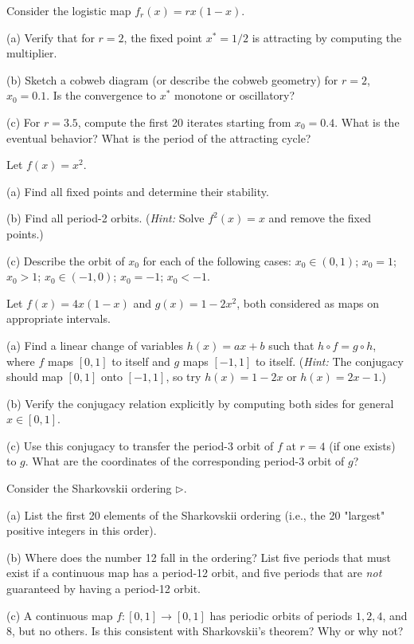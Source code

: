 \begin{exercise}
Consider the logistic map $f_r(x) = rx(1-x)$.

(a) Verify that for $r = 2$, the fixed point $x^* = 1/2$ is attracting by computing the multiplier.

(b) Sketch a cobweb diagram (or describe the cobweb geometry) for $r = 2$, $x_0 = 0.1$. Is the convergence to $x^*$ monotone or oscillatory?

(c) For $r = 3.5$, compute the first 20 iterates starting from $x_0 = 0.4$. What is the eventual behavior? What is the period of the attracting cycle?
\end{exercise}


\begin{exercise}
Let $f(x) = x^2$.

(a) Find all fixed points and determine their stability.

(b) Find all period-2 orbits. (\textit{Hint:} Solve $f^2(x) = x$ and remove the fixed points.)

(c) Describe the orbit of $x_0$ for each of the following cases: $x_0 \in (0,1)$; $x_0 = 1$; $x_0 > 1$; $x_0 \in (-1,0)$; $x_0 = -1$; $x_0 < -1$.
\end{exercise}


\begin{exercise}
Let $f(x) = 4x(1-x)$ and $g(x) = 1 - 2x^2$, both considered as maps on appropriate intervals.

(a) Find a linear change of variables $h(x) = ax + b$ such that $h \circ f = g \circ h$, where $f$ maps $[0,1]$ to itself and $g$ maps $[-1,1]$ to itself. (\textit{Hint:} The conjugacy should map $[0,1]$ onto $[-1,1]$, so try $h(x) = 1 - 2x$ or $h(x) = 2x - 1$.)

(b) Verify the conjugacy relation explicitly by computing both sides for general $x \in [0,1]$.

(c) Use this conjugacy to transfer the period-3 orbit of $f$ at $r = 4$ (if one exists) to $g$. What are the coordinates of the corresponding period-3 orbit of $g$?
\end{exercise}


\begin{exercise}
Consider the Sharkovskii ordering $\triangleright$.

(a) List the first 20 elements of the Sharkovskii ordering (i.e., the 20 "largest" positive integers in this order).

(b) Where does the number 12 fall in the ordering? List five periods that must exist if a continuous map has a period-12 orbit, and five periods that are \textit{not} guaranteed by having a period-12 orbit.

(c) A continuous map $f: [0,1] \to [0,1]$ has periodic orbits of periods $1, 2, 4$, and $8$, but no others. Is this consistent with Sharkovskii's theorem? Why or why not?
\end{exercise}


